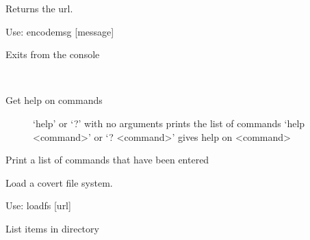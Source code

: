 \documentclass[letterpaper,12pt,openany,oneside]{sphinxmanual}
\begin{document}
\begin{fulllineitems}
\begin{fulllineitems}
Returns the url.

Use: encodemsg {[}message{]}

\end{fulllineitems}


\begin{fulllineitems}
\label{console:webStegFS.console.Console.do_exit}
Exits from the console

\end{fulllineitems}


\begin{fulllineitems}
\label{console:webStegFS.console.Console.do_help}~\begin{description}
\item[{Get help on commands}] \leavevmode
`help' or `?' with no arguments prints the list of commands
`help \textless{}command\textgreater{}' or `? \textless{}command\textgreater{}' gives help on \textless{}command\textgreater{}

\end{description}

\end{fulllineitems}


\begin{fulllineitems}
\label{console:webStegFS.console.Console.do_hist}
Print a list of commands that have been entered

\end{fulllineitems}


\begin{fulllineitems}
\label{console:webStegFS.console.Console.do_loadfs}
Load a covert file system.

Use: loadfs {[}url{]}

\end{fulllineitems}


\begin{fulllineitems}
\label{console:webStegFS.console.Console.do_ls}
List items in directory


\end{fulllineitems}
\end{fulllineitems}
\end{document}
